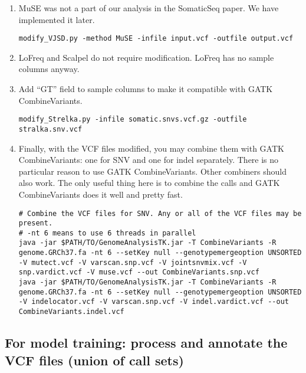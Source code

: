 \documentclass[10pt,letterpaper]{article}
\begin{document}
\begin{sloppypar}
\begin{enumerate}
\item
MuSE was not a part of our analysis in the SomaticSeq paper. We have implemented it later. 
	
\begin{lstlisting}
modify_VJSD.py -method MuSE -infile input.vcf -outfile output.vcf
\end{lstlisting}


\item
LoFreq and Scalpel do not require modification. LoFreq has no sample columns anyway. 


\item
Add ``GT'' field to sample columns to make it compatible with GATK CombineVariants.

\begin{lstlisting}
modify_Strelka.py -infile somatic.snvs.vcf.gz -outfile stralka.snv.vcf
\end{lstlisting}


\item
Finally, with the VCF files modified, you may combine them with GATK CombineVariants: one for SNV and one for indel separately. There is no particular reason to use GATK CombineVariants. Other combiners should also work. The only useful thing here is to combine the calls and GATK CombineVariants does it well and pretty fast. 
	
\begin{lstlisting}
# Combine the VCF files for SNV. Any or all of the VCF files may be present.
# -nt 6 means to use 6 threads in parallel
java -jar $PATH/TO/GenomeAnalysisTK.jar -T CombineVariants -R genome.GRCh37.fa -nt 6 --setKey null --genotypemergeoption UNSORTED -V mutect.vcf -V varscan.snp.vcf -V jointsnvmix.vcf -V snp.vardict.vcf -V muse.vcf --out CombineVariants.snp.vcf
java -jar $PATH/TO/GenomeAnalysisTK.jar -T CombineVariants -R genome.GRCh37.fa -nt 6 --setKey null --genotypemergeoption UNSORTED -V indelocator.vcf -V varscan.snp.vcf -V indel.vardict.vcf --out CombineVariants.indel.vcf
\end{lstlisting}


\end{enumerate}





\subsection{For model training: process and annotate the VCF files (union of call sets)}


\end{sloppypar}
\end{document}
